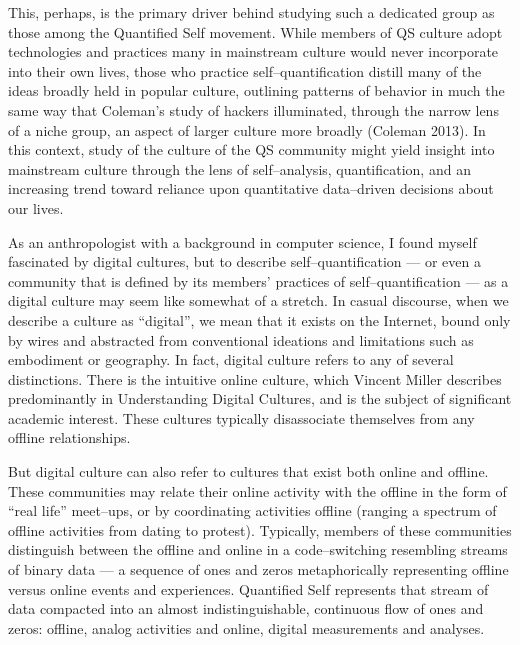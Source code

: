\documentclass{article}
\begin{document}
This,
perhaps,
is the primary driver behind studying such a dedicated group as those among the Quantified Self movement.
While members of QS culture adopt technologies and practices many in mainstream culture would never incorporate into their own lives,
those who practice self--quantification distill many of the ideas broadly held in popular culture,
outlining patterns of behavior in much the same way that Coleman's study of hackers illuminated,
through the narrow lens of a niche group,
an aspect of larger culture more broadly
(Coleman 2013).
In this context,
study of the culture of the QS community might yield insight into mainstream culture through the lens of self--analysis,
quantification,
and an increasing trend toward reliance upon quantitative data--driven decisions about our lives.

As an anthropologist with a background in computer science,
I found myself fascinated by digital cultures,
but to describe self--quantification
--- or even a community that is defined by its members' practices of self--quantification ---
as a digital culture may seem like somewhat of a stretch.
In casual discourse,
when we describe a culture as ``digital'',
we mean that it exists on the Internet,
bound only by wires and abstracted from conventional ideations and limitations such as embodiment or geography.
In fact,
digital culture refers to any of several distinctions.
There is the intuitive online culture,
which Vincent Miller describes predominantly in Understanding Digital Cultures,
and is the subject of significant academic interest.
These cultures typically disassociate themselves from any offline relationships.

But digital culture can also refer to cultures that exist both online and offline.
These communities may relate their online activity with the offline in the form of ``real life'' meet--ups,
or by coordinating activities offline
(ranging a spectrum of offline activities from dating to protest).
Typically,
members of these communities distinguish between the offline and online in a code--switching resembling streams of binary data
--- a sequence of ones and zeros metaphorically representing offline versus online events and experiences.
Quantified Self represents that stream of data compacted into an almost indistinguishable,
continuous flow of ones and zeros:
offline,
analog activities and online,
digital measurements and analyses.
\end{document}
